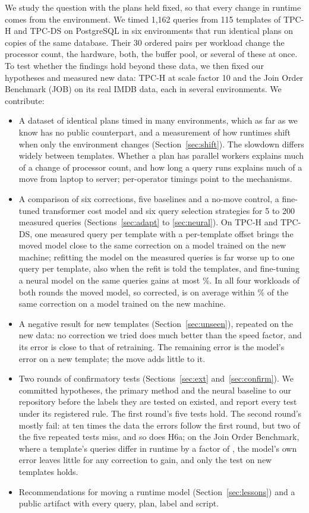 \documentclass[conference]{IEEEtran}
\begin{document}
We study the question with the plans held fixed, so that every change in
runtime comes from the environment. We timed 1,162 queries from 115
templates of TPC-H and TPC-DS on PostgreSQL in six environments that run
identical plans on copies of the same database. Their 30 ordered pairs per
workload change the processor count, the hardware, both, the buffer pool,
or several of these at once. To test whether the findings hold beyond
these data, we then fixed our hypotheses and measured new data: TPC-H at
scale factor 10 and the Join Order Benchmark (JOB) on its real IMDB data,
each in several environments. We contribute:
\begin{itemize}
\item A dataset of identical plans timed in many environments, which as far
  as we know has no public counterpart, and a measurement of how runtimes
  shift when only the environment changes (Section~\ref{sec:shift}). The
  slowdown differs widely between templates. Whether a plan has parallel
  workers explains much of a change of processor count, and how long a query
  runs explains much of a move from laptop to server; per-operator timings
  point to the mechanisms.
\item A comparison of six corrections, five baselines and a no-move
  control, a fine-tuned
  transformer cost model and six query selection strategies for 5 to 200
  measured queries (Sections~\ref{sec:adapt} to \ref{sec:neural}). On
  TPC-H and TPC-DS, one measured query per template with a per-template
  offset brings the moved model close to the same correction on a model
  trained on the new machine; refitting the model on the measured queries
  is far worse up to one query per template, also when the refit is told
  the templates, and fine-tuning a neural model on the same queries gains
  at most \XtraNnGainPct\%. In all four workloads of both rounds the moved
  model, so corrected, is on average within \XeMoveMaxPct\% of the same
  correction on a model trained on the new machine.
\item A negative result for new templates (Section~\ref{sec:unseen}),
  repeated on the new data: no correction we tried does much better than
  the speed factor, and its error is close to that of retraining. The
  remaining error is the model's error on a new template; the move adds
  little to it.
\item Two rounds of confirmatory tests (Sections~\ref{sec:ext}
  and~\ref{sec:confirm}). We committed hypotheses, the primary method and
  the neural baseline to our repository before the labels they are tested
  on existed, and report every test under its registered rule. The first
  round's five tests hold. The second round's mostly fail: at ten times the
  data the errors follow the first round, but two of the five repeated
  tests miss, and so does H6a; on the Join Order Benchmark, where a
  template's queries differ in runtime by a factor of \XeSpreadJob, the
  model's own error leaves little for any correction to gain, and only the
  test on new templates holds.
\item Recommendations for moving a runtime model (Section~\ref{sec:lessons})
  and a public artifact with every query, plan, label and script.
\end{itemize}
\end{document}
